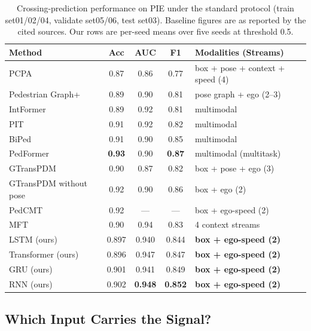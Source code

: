 \documentclass[mti,article,submit,moreauthors]{Definitions/mdpi}
\begin{document}
\begin{table}[htbp]
\caption{Crossing-prediction performance on PIE under the standard protocol (train set01/02/04, validate set05/06, test set03). Baseline figures are as reported by the cited sources. Our rows are per-seed means over five seeds at threshold 0.5.\label{tab:baselines}}
\begin{tabularx}{\textwidth}{lcccL}
\toprule
\textbf{Method} & \textbf{Acc} & \textbf{AUC} & \textbf{F1} & \textbf{Modalities (Streams)}\\
\midrule
PCPA~\citep{kotseruba2021benchmark} & 0.87 & 0.86 & 0.77 & box + pose + context + speed (4)\\
Pedestrian Graph+~\citep{cadena2022pedgraph} & 0.89 & 0.90 & 0.81 & pose graph + ego (2--3)\\
IntFormer~\citep{lorenzo2021intformer} & 0.89 & 0.92 & 0.81 & multimodal\\
PIT~\citep{zhou2023pit} & 0.91 & 0.92 & 0.82 & multimodal\\
BiPed~\citep{rasouli2023pedformer} & 0.91 & 0.90 & 0.85 & multimodal\\
PedFormer~\citep{rasouli2023pedformer} & \textbf{0.93} & 0.90 & \textbf{0.87} & multimodal (multitask)\\
GTransPDM~\citep{xie2025gtranspdm} & 0.90 & 0.87 & 0.82 & box + pose + ego (3)\\
GTransPDM without pose~\citep{xie2025gtranspdm} & 0.92 & 0.90 & 0.86 & box + ego (2)\\
PedCMT~\citep{chen2024pedcmt} & 0.92 & --- & --- & box + ego-speed (2)\\
MFT~\citep{li2025mft} & 0.90 & 0.94 & 0.83 & 4 context streams\\
\midrule
LSTM (ours) & 0.897 & 0.940 & 0.844 & \textbf{box + ego-speed (2)}\\
Transformer (ours) & 0.896 & 0.947 & 0.847 & \textbf{box + ego-speed (2)}\\
GRU (ours) & 0.901 & 0.941 & 0.849 & \textbf{box + ego-speed (2)}\\
RNN (ours) & 0.902 & \textbf{0.948} & \textbf{0.852} & \textbf{box + ego-speed (2)}\\
\bottomrule
\end{tabularx}
\end{table}

\subsection{Which Input Carries the Signal?}
\label{sec:ego-ablation}
\end{document}
